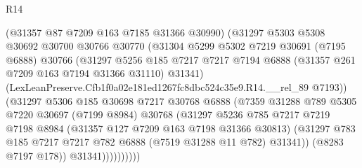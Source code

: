 \begin{lexlean}{R14}
\begin{coremodule}
                            (@31357 @87 @7209 @163 @7185 @31366 @30990)
                            (@31297
                              @5303
                              @5308
                              @30692
                              @30700
                              @30766
                              @30770
                              (@31304
                                @5299
                                @5302
                                @7219
                                @30691
                                (@7195 @6888)
                                @30766
                                (@31297
                                  @5256
                                  @185
                                  @7217
                                  @7217
                                  @7194
                                  @6888
                                  (@31357 @261 @7209 @163 @7194 @31366 @31110)
                                  @31341)
                                (LexLeanPreserve.Cfb1f0a02e181ed1267fc8dbc524c35e9.R14.__rel_89
                                  @7193))
                              (@31297
                                @5306
                                @185
                                @30698
                                @7217
                                @30768
                                @6888
                                (@7359
                                  @31288
                                  @789
                                  @5305
                                  @7220
                                  @30697
                                  (@7199 @8984)
                                  @30768
                                  (@31297
                                    @5236
                                    @785
                                    @7217
                                    @7219
                                    @7198
                                    @8984
                                    (@31357 @127 @7209 @163 @7198 @31366 @30813)
                                    (@31297
                                      @783
                                      @185
                                      @7217
                                      @7217
                                      @782
                                      @6888
                                      (@7519 @31288 @11 @782)
                                      @31341))
                                  (@8283 @7197 @178))
                                @31341))))))))))

\end{coremodule}
\end{lexlean}
